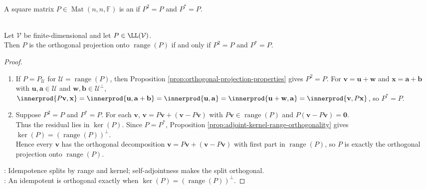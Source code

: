 \begin{definition} \label{def:orthogonal-projection-matrix} \\
A square matrix $P\in\operatorname{Mat}(n,n,\mathbb{F})$ is an  if $P^2=P$ and $P^*=P$.
\end{definition}

\begin{theorem} \label{thm:orthogonal-projection-self-adjoint-idempotent} \\
Let $\mathcal{V}$ be finite-dimensional and let $P\in\LL(\mathcal{V})$.\\
Then $P$ is the orthogonal projection onto $\operatorname{range}(P)$ if and only if $P^2=P$ and $P^*=P$.
\begin{proof}
\begin{enumerate}[label=\roman*.]
\setlength{\itemsep}{0pt}
\item[$(\Rightarrow)$] If $P=P_{\mathcal{U}}$ for $\mathcal{U}=\operatorname{range}(P)$, then Proposition \ref{prop:orthogonal-projection-properties} gives $P^2=P$. For $\mathbf{v}=\mathbf{u}+\mathbf{w}$ and $\mathbf{x}=\mathbf{a}+\mathbf{b}$ with $\mathbf{u},\mathbf{a}\in\mathcal{U}$ and $\mathbf{w},\mathbf{b}\in\mathcal{U}^{\perp}$, $\innerprod{P\mathbf{v},\mathbf{x}}=\innerprod{\mathbf{u},\mathbf{a}+\mathbf{b}}=\innerprod{\mathbf{u},\mathbf{a}} =\innerprod{\mathbf{u}+\mathbf{w},\mathbf{a}}=\innerprod{\mathbf{v},P\mathbf{x}}$, so $P^*=P$.
\item[$(\Leftarrow)$] Suppose $P^2=P$ and $P^*=P$. For each $\mathbf{v}$, $\mathbf{v}=P\mathbf{v}+(\mathbf{v}-P\mathbf{v})$ with $P\mathbf{v}\in\operatorname{range}(P)$ and $P(\mathbf{v}-P\mathbf{v})=\mathbf{0}$.\\
Thus the residual lies in $\ker(P)$. Since $P=P^*$, Proposition \ref{prop:adjoint-kernel-range-orthogonality} gives $\ker(P)=(\operatorname{range}(P))^{\perp}$.\\
Hence every $\mathbf{v}$ has the orthogonal decomposition $\mathbf{v}=P\mathbf{v}+(\mathbf{v}-P\mathbf{v})$ with first part in $\operatorname{range}(P)$, so $P$ is exactly the orthogonal projection onto $\operatorname{range}(P)$.
\end{enumerate}
: Idempotence splits by range and kernel; self-adjointness makes the split orthogonal.\\
: An idempotent is orthogonal exactly when $\ker(P)=(\operatorname{range}(P))^{\perp}$.
\end{proof}
\end{theorem}

